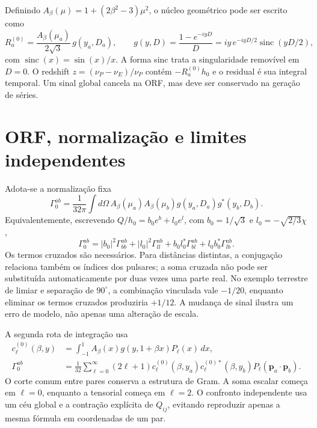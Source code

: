 Definindo $A_\beta(\mu)=1+(2\beta^2-3)\mu^2$, o núcleo geométrico pode ser escrito como
\begin{equation}
 R_a^{(0)}=\frac{A_\beta(\mu_a)}{2\sqrt3}\,g(y_a,D_a),\qquad
 g(y,D)=\frac{1-e^{-iyD}}{D}
       =iy\,e^{-iyD/2}\operatorname{sinc}(yD/2),
\end{equation}
com $\operatorname{sinc}(x)=\sin(x)/x$. A forma sinc trata a singularidade removível em $D=0$. O redshift $z=(\nu_P-\nu_E)/\nu_P$ contém $-R_a^{(0)}h_0$ e o residual é sua integral temporal. Um sinal global cancela na ORF, mas deve ser conservado na geração de séries.

\section{ORF, normalização e limites independentes}

Adota-se a normalização fixa
\begin{equation}
 \Gamma_0^{ab}=\frac{1}{32\pi}\int d\Omega\,
 A_\beta(\mu_a)A_\beta(\mu_b)
 g(y_a,D_a)g^*(y_b,D_b).
\end{equation}
Equivalentemente, escrevendo $Q/h_0=b_0e^b+l_0e^l$, com $b_0=1/\sqrt3$ e $l_0=-\sqrt{2/3}\chi$,
\begin{equation}
 \Gamma_0^{ab}=|b_0|^2\Gamma_{bb}^{ab}+|l_0|^2\Gamma_{ll}^{ab}
 +b_0l_0^*\Gamma_{bl}^{ab}+l_0b_0^*\Gamma_{lb}^{ab}.
\end{equation}
Os termos cruzados são necessários. Para distâncias distintas, a conjugação relaciona também os índices dos pulsares; a soma cruzada não pode ser substituída automaticamente por duas vezes uma parte real. No exemplo terrestre de limiar e separação de $90^\circ$, a combinação vinculada vale $-1/20$, enquanto eliminar os termos cruzados produziria $+1/12$. A mudança de sinal ilustra um erro de modelo, não apenas uma alteração de escala.

A segunda rota de integração usa
\begin{align}
 c_\ell^{(0)}(\beta,y)&=\int_{-1}^{1} A_\beta(x)g(y,1+\beta x)P_\ell(x)\,dx,\\
 \Gamma_0^{ab}&=\frac1{32}\sum_{\ell=0}^{\infty}(2\ell+1)
 c_\ell^{(0)}(\beta,y_a)c_\ell^{(0)*}(\beta,y_b)P_\ell(\boldsymbol p_a\cdot\boldsymbol p_b).
\end{align}
O corte comum entre pares conserva a estrutura de Gram. A soma escalar começa em $\ell=0$, enquanto a tensorial começa em $\ell=2$. O confronto independente usa um céu global e a contração explícita de $Q_{ij}$, evitando reproduzir apenas a mesma fórmula em coordenadas de um par.

